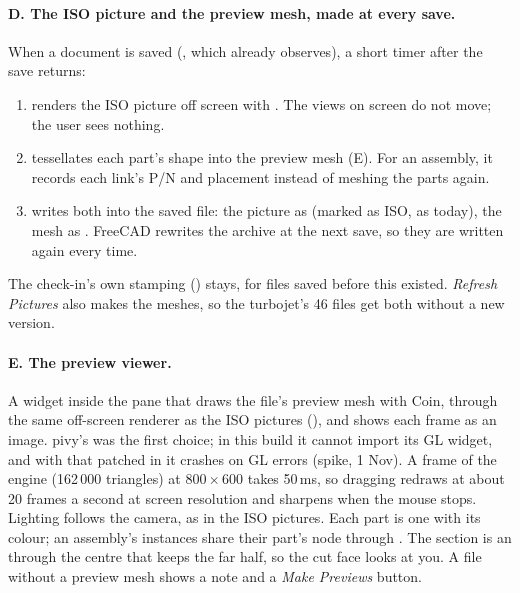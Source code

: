 \paragraph{D. The ISO picture and the preview mesh, made at every save.} When a document is saved
(, which  already observes), a short timer after the save
returns:
\begin{enumerate}[nosep]
  \item renders the ISO picture off screen with . The views on screen do not move;
        the user sees nothing.
  \item tessellates each part's shape into the preview mesh (E). For an assembly, it records each link's P/N and
        placement instead of meshing the parts again.
  \item writes both into the saved file: the picture as  (marked as ISO, as today), the
        mesh as . FreeCAD rewrites the archive at the next save, so they are written again
        every time.
\end{enumerate}
The check-in's own stamping () stays, for files saved before this existed. \emph{Refresh
Pictures} also makes the meshes, so the turbojet's 46 files get both without a new version.

\paragraph{E. The preview viewer.} A widget inside the pane that draws the file's preview mesh with Coin, through
the same off-screen renderer as the ISO pictures (), and shows each frame as an image.
pivy's  was the first choice; in this build it cannot import its GL widget, and with that
patched in it crashes on GL errors (spike, 1 Nov). A frame of the engine (162\,000 triangles) at
800\,$\times$\,600 takes 50\,ms, so dragging redraws at about 20 frames a second at screen resolution and
sharpens when the mouse stops. Lighting follows the camera, as in the ISO pictures. Each part is one
 with its colour; an assembly's instances share their part's node through
. The section is an  through the centre that keeps the far half, so the
cut face looks at you. A file without a preview mesh shows a note and a \emph{Make Previews} button.

